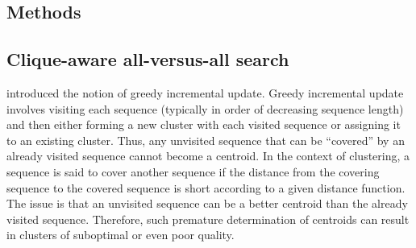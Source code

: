 \documentclass{bioinfo}
\begin{document}
\begin{methods}
	
\section{Methods}


\subsection{Clique-aware all-versus-all search}
\label{subsec:clique-aware}
 introduced the notion of greedy incremental update.
Greedy incremental update involves visiting each sequence (typically in order of decreasing sequence length) and then either forming a new cluster with each visited sequence or assigning it to an existing cluster. Thus, any unvisited sequence that can be ``covered'' by an already visited sequence cannot become a centroid. 
In the context of clustering, 
a sequence is said to cover another sequence if the distance from the covering sequence to the covered sequence is short according to a given distance function. 
The issue is that an unvisited sequence can be a better centroid than the already visited sequence. 
Therefore, such premature determination of centroids can result in clusters of suboptimal or even poor quality.


\end{methods}
\end{document}
